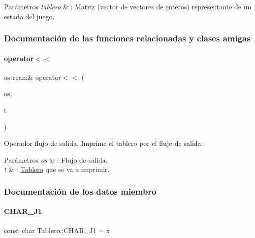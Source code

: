 \begin{DoxyParams}{Parámetros}
{\em tablero} & \+: Matriz (vector de vectores de enteros) representante de un estado del juego. \\
\hline
\end{DoxyParams}


\subsubsection{Documentación de las funciones relacionadas y clases amigas}
\hypertarget{classTablero_a320d149883604290d56f857c9b5bcf1d}{}\label{classTablero_a320d149883604290d56f857c9b5bcf1d} 
\paragraph{\texorpdfstring{operator$<$$<$}{operator<<}}
{\footnotesize\ttfamily ostream\& operator$<$$<$ (\begin{DoxyParamCaption}\item[{ostream \&}]{os,  }\item[{const \hyperlink{classTablero}{Tablero} \&}]{t }\end{DoxyParamCaption})\hspace{0.3cm}{\ttfamily [friend]}}



Operador flujo de salida. Imprime el tablero por el flujo de salida. 


\begin{DoxyParams}{Parámetros}
{\em os} & \+: Flujo de salida. \\
\hline
{\em t} & \+: \hyperlink{classTablero}{Tablero} que se va a imprimir. \\
\hline
\end{DoxyParams}


\subsubsection{Documentación de los datos miembro}
\hypertarget{classTablero_a5f3fdf5c4f76f9a7a6d6ad664b72ce44}{}\label{classTablero_a5f3fdf5c4f76f9a7a6d6ad664b72ce44} 
\paragraph{\texorpdfstring{C\+H\+A\+R\+\_\+\+J1}{CHAR\_J1}}
{\footnotesize\ttfamily const char Tablero\+::\+C\+H\+A\+R\+\_\+\+J1 = \textquotesingle{}x\textquotesingle{}\hspace{0.3cm}{\ttfamily [static]}}



